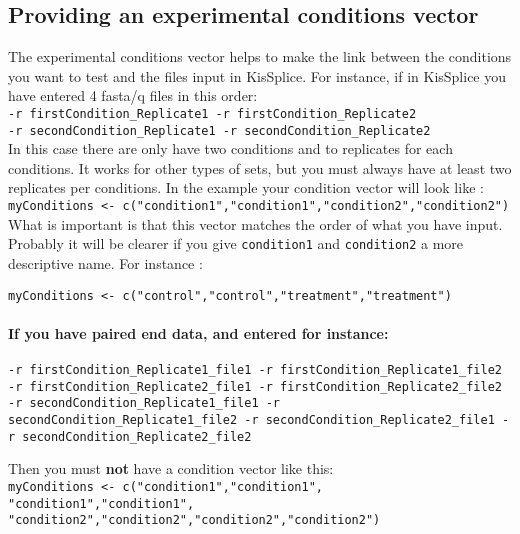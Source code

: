 \documentclass[english, a4paper, 12pt]{article}
\begin{document}
\subsection{Providing an experimental conditions vector}
The experimental conditions vector helps to make the link between the conditions you want to test and the files input in KisSplice. For instance, if in KisSplice you have entered 4 fasta/q files in this order:\\

\texttt{-r firstCondition\_Replicate1 -r firstCondition\_Replicate2\\
-r secondCondition\_Replicate1 -r secondCondition\_Replicate2}\\

In this case there are only have two conditions and to replicates for each conditions. It works for other types of sets, but you must always have at least two replicates per conditions. In the example your condition vector will look like :\\

\texttt{myConditions <- c("condition1","condition1","condition2","condition2")}\\

What is important is that this vector matches the order of what you have input. Probably it will be clearer if you give \texttt{condition1} and \texttt{condition2} a more descriptive name. For instance :

\texttt{myConditions <- c("control","control","treatment","treatment")}\\
 

\paragraph{If you have paired end data, and entered for instance:\\}

\texttt{-r firstCondition\_Replicate1\_file1 -r firstCondition\_Replicate1\_file2
-r firstCondition\_Replicate2\_file1  -r firstCondition\_Replicate2\_file2 
-r secondCondition\_Replicate1\_file1 -r secondCondition\_Replicate1\_file2
-r secondCondition\_Replicate2\_file1 -r secondCondition\_Replicate2\_file2}

Then you must \textbf{not} have a condition vector like this:\\

\texttt{myConditions <- c("condition1","condition1", "condition1","condition1",\\
"condition2","condition2","condition2","condition2")}\\
\end{document}

